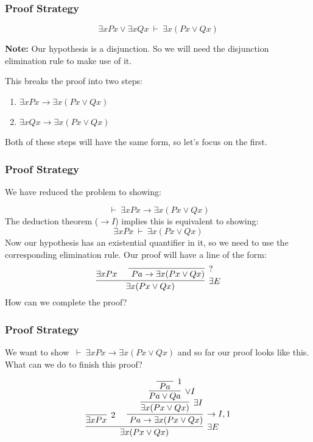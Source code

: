 \documentclass{beamer}
\theoremstyle{indentDefn} \newtheorem{defn}[]{Definition}
\begin{document}
\begin{frame}
	\frametitle{Proof Strategy}
	
	$$\exists x Px \lor \exists x Qx \ \vdash \ \exists x (Px \lor Qx)$$

	{\bf Note:} Our hypothesis is a disjunction. So we will need the disjunction elimination rule to make use of it. 
	
	\vspace{20mm}
	
	This breaks the proof into two steps: 
	
	\begin{center}
	\begin{enumerate}
		\item $\exists x Px \rightarrow \exists x (Px \lor Qx)$
		\item $\exists x Qx \rightarrow \exists x (Px \lor Qx)$		
	\end{enumerate}
	\end{center}
	
	Both of these steps will have the same form, so let's focus on the first.		
\end{frame}

\begin{frame}
	\frametitle{Proof Strategy}

	We have reduced the problem to showing:	

	 $$ \ \vdash \ \exists x Px \rightarrow \exists x (Px \lor Qx)$$
	\pause	
	The deduction theorem ($\rightarrow I$) implies this is equivalent to showing:	
	$$\exists x Px \ \vdash \  \exists x (Px \lor Qx)$$	
	\pause	
	Now our hypothesis has an existential quantifier in it, so we need to use the corresponding elimination rule. Our proof will have a line of the form: 	
	\vspace{5mm}	
	$$ \infer[\exists E]{\exists x (Px \lor Qx)}{\exists x Px \ & \infer[?]{\ Pa \rightarrow \exists x (Px \lor Qx)}{} } $$
	How can we complete the proof? 
		
\end{frame}

\begin{frame}
	\frametitle{Proof Strategy}
	
	We want to show $ \ \vdash \ \exists x Px \rightarrow \exists x (Px \lor Qx)$ and so far our proof looks like this. What can we do to finish this proof?
	
	$$ \infer[\exists E]{\exists x (Px \lor Qx)}{\infer[2]{\exists x Px}{} \ & \infer[\rightarrow I,1]{\ Pa \rightarrow \exists x (Px \lor Qx)}{\infer[\exists I]{\exists x (Px \lor Qx)}
			{\infer[\lor I]{Pa \lor Qa}
				{\infer[1]{ \ Pa \ }{}}}}} $$
	
	\vspace{30mm}		
	
\end{frame}
\end{document}
